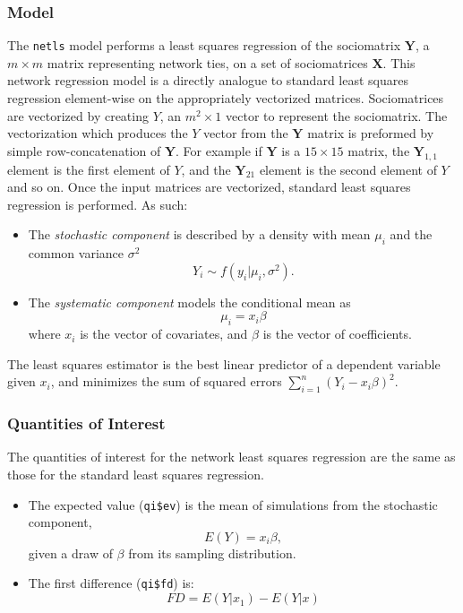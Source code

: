 \subsubsection{Model}
The {\tt netls} model performs a least squares regression of the
sociomatrix $\mathbf{Y}$, a $m \times m$ matrix representing network
ties, on a set of sociomatrices $\mathbf{X}$. This network regression
model is a directly analogue to standard least squares regression
element-wise on the appropriately vectorized matrices. Sociomatrices
are vectorized by creating $Y$, an $m^{2} \times 1$ vector to
represent the sociomatrix. The vectorization which produces the $Y$
vector from the $\mathbf{Y}$ matrix is preformed by simple
row-concatenation of $\mathbf{Y}$. For example if $\mathbf{Y}$ is a
$15 \times 15$ matrix, the $\mathbf{Y}_{1,1}$ element is the first
element of $Y$, and the $\mathbf{Y}_{21}$ element is the second
element of $Y$ and so on. Once the input matrices are vectorized,
standard least squares regression is performed. As such:
\begin{itemize}
\item The \emph{stochastic component} is described by a density with
mean $\mu_{i}$ and the common variance $\sigma^{2}$ 
\begin{equation*}
Y_{i} \sim f(y_{i} | \mu_{i}, \sigma^{2}).
\end{equation*}

\item The \emph{systematic component} models the conditional mean as
\begin{equation*}
\mu_{i} = x_{i}\beta
\end{equation*}
where $x_{i}$ is the vector of covariates, and $\beta$ is the vector of coefficients.
\end{itemize}
The least squares estimator is the best linear predictor of a
dependent variable given $x_{i}$, and minimizes the sum of squared
errors $\sum_{i = 1}^{n} (Y_{i} - x_{i}\beta)^{2}$.

\subsubsection{Quantities of Interest}
The quantities of interest for the network least squares regression
are the same as those for the standard least squares regression.
\begin{itemize}
\item The expected value ({\tt qi\$ev}) is the mean of simulations from
the stochastic component, 
\begin{equation*}
E(Y) = x_{i}\beta,
\end{equation*}
given a draw of $\beta$ from its sampling distribution.

\item The first difference ({\tt qi\$fd}) is:
\begin{equation*}
FD = E(Y | x_{1}) - E(Y | x)
\end{equation*}
\end{itemize}

